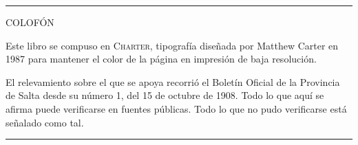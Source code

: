\documentclass[10pt,a4paper,twoside,openright]{book}
\begin{document}
\cleardoublepage
\thispagestyle{empty}
\null\vfill
\begin{center}
{\color{gris}\rule{4cm}{0.4pt}}

\vspace{1.4em}
{\sffamily\scriptsize\color{gris}\setlength{\baselineskip}{1.7em}
COLOFÓN\par}
\vspace{0.9em}
\begin{minipage}{0.72\textwidth}\centering\footnotesize\color{gris}
Este libro se compuso en \textsc{Charter}, tipografía diseñada por Matthew Carter
en 1987 para mantener el color de la página en impresión de baja resolución.

El relevamiento sobre el que se apoya recorrió el Boletín Oficial de la Provincia
de Salta desde su número 1, del 15 de octubre de 1908. Todo lo que aquí se afirma
puede verificarse en fuentes públicas. Todo lo que no pudo verificarse está
señalado como tal.
\end{minipage}

\vspace{1.4em}
{\color{gris}\rule{4cm}{0.4pt}}
\end{center}
\vfill
\end{document}
